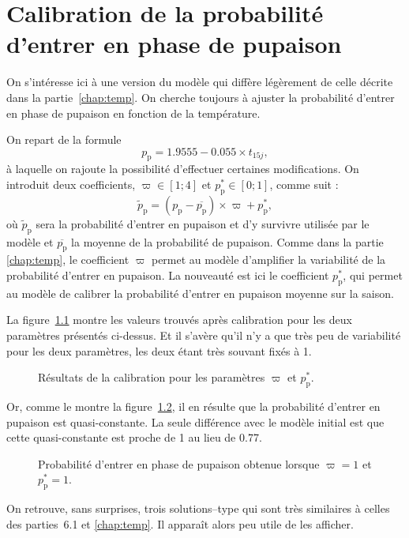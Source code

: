 \chapter{Calibration de la probabilité d'entrer en phase de pupaison} 
\label{chap:pup_chelou}

On s'intéresse ici à une version du modèle qui diffère légèrement de celle décrite dans la partie~\ref{chap:temp}.
On cherche toujours à ajuster la probabilité d'entrer en phase de pupaison en fonction de la température.

On repart de la formule
\[
p_{\text{p}} = 1.9555 - 0.055\times t_{15j},
\]
à laquelle on rajoute la possibilité d'effectuer certaines modifications.
On introduit deux coefficients, $\varpi\in [1; 4]$ et $p_{\text{p}}^*\in [0; 1]$, comme suit :
\[
\widetilde p_{\text{p}} = \left( p_{\text{p}} - \overline{p_{\text{p}}} \right) \times \varpi + p_{\text{p}}^*,
\]
où $\widetilde p_{\text{p}}$ sera la probabilité d'entrer en pupaison et d'y survivre utilisée par le modèle et $\overline{p_{\text{p}}}$ la moyenne de la probabilité de pupaison.
Comme dans la partie \ref{chap:temp}, le coefficient $\varpi$ permet au modèle d'amplifier la variabilité de la probabilité d'entrer en pupaison.
La nouveauté est ici le coefficient $p_{\text{p}}^*$, qui permet au modèle de calibrer la probabilité d'entrer en pupaison moyenne sur la saison.





La figure~\ref{fig:params} montre les valeurs trouvés après calibration pour les deux paramètres présentés ci-dessus.
Et il s'avère qu'il n'y a  que très peu de variabilité pour les deux paramètres, les deux étant très souvant fixés à 1.




\begin{figure}
 \centering
 \caption{Résultats de la calibration pour les paramètres $\varpi$ et $p_{\text{p}}^*$.}
 \label{fig:params}
\end{figure}


Or, comme le montre la figure~\ref{fig:prob}, il en résulte que la probabilité d'entrer en pupaison est quasi-constante.
La seule différence avec le modèle initial est que cette quasi-constante est proche de 1 au lieu de 0.77.

\begin{figure}
 \centering
 \caption{Probabilité d'entrer en phase de pupaison obtenue lorsque $\varpi = 1$ et $p_{\text{p}}^* = 1$.}
 \label{fig:prob}
\end{figure}

On retrouve, sans surprises, trois solutions--type qui sont très similaires à celles des parties~6.1 et \ref{chap:temp}.
Il apparaît alors peu utile de les afficher.
